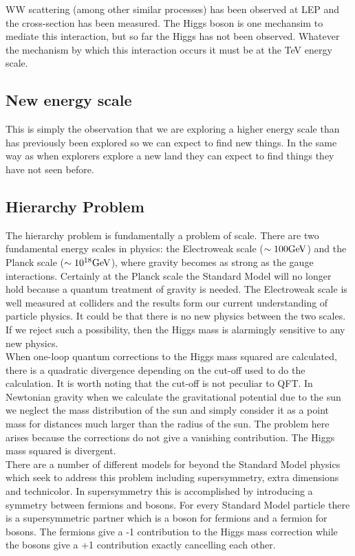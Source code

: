 WW scattering (among other similar processes) has been observed at LEP and the
cross-section has been measured. The Higgs boson is one mechansim to mediate this interaction, but so far
the Higgs has not been observed. Whatever the mechanism by which this
interaction occurs it must be at the TeV energy scale. \\

\subsection{New energy scale}

This is simply the observation that we are exploring a higher energy scale than
has previously been explored so we can expect to find new things. In the same
way as when explorers explore a new land they can expect to find things they
have not seen before.

\subsection{Hierarchy Problem}

The hierarchy problem is fundamentally a problem of scale. There are two
fundamental energy scales in physics: the Electroweak scale ($\sim100\mbox{GeV}$) and
the Planck scale ($\sim10^{18}\mbox{GeV}$), where gravity becomes as strong as the 
gauge interactions. Certainly at the Planck scale the Standard Model will no
longer hold because a quantum treatment of gravity is needed. The Electroweak 
scale is well measured at colliders and the results form our current 
understanding of particle physics. It could be that there is no new physics 
between the two scales. If we reject such a possibility, then the Higgs mass is
alarmingly sensitive to any new physics. \\

When one-loop quantum corrections to the Higgs mass squared are calculated, 
there is a quadratic divergence depending on the cut-off used to do the
calculation. It is worth noting that the cut-off is not peculiar to QFT. In
Newtonian gravity when we calculate the gravitational potential due to the sun
we neglect the mass distribution of the sun and simply consider it as a point
mass for distances much larger than the radius of the sun. The problem here
arises because the corrections do not give a vanishing contribution. The Higgs
mass squared is divergent. \\

There are a number of different models for beyond the Standard Model physics 
which seek to address this problem including supersymmetry, extra dimensions 
and technicolor. In supersymmetry this is accomplished by introducing a symmetry
between fermions and bosons. For every Standard Model particle there is a 
supersymmetric partner which is a boson for fermions and a fermion for bosons. 
The fermions give a -1 contribution to the Higgs mass correction while the 
bosons give a +1 contribution exactly cancelling each other.


